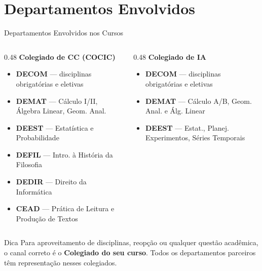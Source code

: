 \documentclass[aspectratio=169]{beamer}
\begin{document}
\section{Departamentos Envolvidos}

\begin{frame}{Departamentos Envolvidos nos Cursos}
  \begin{columns}[T]
    \begin{column}{0.48\textwidth}
      \textcolor{mcc}{\textbf{Colegiado de CC (COCIC)}}
      \begin{itemize}\setlength\itemsep{2pt}
        \item \textbf{DECOM} --- disciplinas obrigatórias e eletivas
        \item \textbf{DEMAT} --- Cálculo I/II, Álgebra Linear, Geom. Anal.
        \item \textbf{DEEST} --- Estatística e Probabilidade
        \item \textbf{DEFIL} --- Intro. à História da Filosofia
        \item \textbf{DEDIR} --- Direito da Informática
        \item \textbf{CEAD} --- Prática de Leitura e Produção de Textos
      \end{itemize}
    \end{column}
    \begin{column}{0.48\textwidth}
      \textcolor{mia}{\textbf{Colegiado de IA}}
      \begin{itemize}\setlength\itemsep{2pt}
        \item \textbf{DECOM} --- disciplinas obrigatórias e eletivas
        \item \textbf{DEMAT} --- Cálculo A/B, Geom. Anal. e Álg. Linear
        \item \textbf{DEEST} --- Estat., Planej. Experimentos, Séries Temporais
      \end{itemize}
    \end{column}
  \end{columns}
  \pause
  \vspace{0.3cm}
  \footnotesize
  \begin{alertblock}{Dica}
    Para aproveitamento de disciplinas, reopção ou qualquer questão acadêmica, o canal correto é o \textbf{Colegiado do seu curso}. Todos os departamentos parceiros têm representação nesses colegiados.
  \end{alertblock}
\end{frame}
\end{document}
